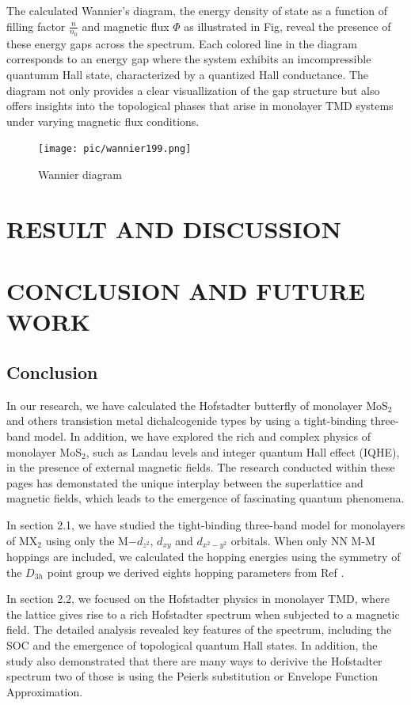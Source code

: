 \documentclass{report}
\begin{document}
The calculated Wannier's diagram, the energy density of state as a function of filling factor $\frac{n}{n_{0}}$ and magnetic flux $\Phi$ as illustrated in Fig, reveal the presence of these energy gaps across the spectrum. Each colored line in the diagram corresponds to an energy gap where the system exhibits an imcompressible quantumm Hall state, characterized by a quantized Hall conductance. The diagram not only provides a clear visuallization of the gap structure but also offers insights into the topological phases that arise in monolayer TMD systems under varying magnetic flux conditions.
\begin{figure}[H]
	\centering
	\texttt{[image: pic/wannier199.png]}
	\caption{Wannier diagram}
\end{figure}

\chapter{RESULT AND DISCUSSION}
\chapter{CONCLUSION AND FUTURE WORK}
\section{Conclusion}
In our research, we have calculated the Hofstadter butterfly of monolayer MoS$_{2}$ and others transistion metal dichalcogenide types by using a tight-binding three-band model. In addition, we have explored the rich and complex physics of monolayer MoS$_2$, such as Landau levels and integer quantum Hall effect (IQHE), in the presence of external magnetic fields. The research conducted within these pages has demonstated the unique interplay between the superlattice and magnetic fields, which leads to the emergence of fascinating quantum phenomena. 

In section 2.1, we have studied the tight-binding three-band model for monolayers of MX$_{2}$ using only the M$-d_{z^{2}}$, $d_{xy}$ and $d_{x^{2} - y{^2}}$ orbitals. When only NN M-M hoppings are included, we calculated the hopping energies using the symmetry of the $D_{3h}$ point group we derived eights hopping parameters from Ref \cite{PhysRevB.88.085433}.

In section 2.2, we focused on the Hofstadter physics in monolayer TMD, where the lattice gives rise to a rich Hofstadter spectrum when subjected to a magnetic field. The detailed analysis revealed key features of the spectrum, including the SOC and the emergence of topological quantum Hall states. In addition, the study also demonstrated that there are many ways to derivive the Hofstadter spectrum two of those is using the Peierls substitution or Envelope Function Approximation.
\end{document}
